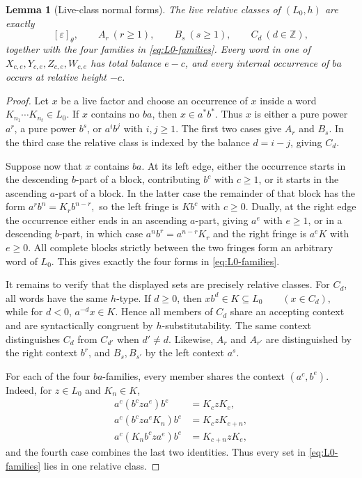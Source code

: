 \documentclass[11pt,a4paper]{article}
\newtheorem{lemma}[theorem]{Lemma}
\newcommand{\eps}{\varepsilon}
\begin{document}
\begin{lemma}[Live-class normal forms]
\label{lem:L0-normal-forms}
The live relative classes of $(L_0,h)$ are exactly
\[
  [\eps]_\theta,\qquad A_r\ (r\ge1),\qquad B_s\ (s\ge1),\qquad C_d\ (d\in\mathbb Z),
\]
together with the four families in \eqref{eq:L0-families}.  Every word in one of
$X_{c,e},Y_{c,e},Z_{c,e},W_{c,e}$ has total balance $e-c$, and every
internal occurrence of $ba$ occurs at relative height $-c$.
\end{lemma}

\begin{proof}
Let $x$ be a live factor and choose an occurrence of $x$ inside a word
\(K_{n_1}\cdots K_{n_t}\in L_0.\)
If $x$ contains no $ba$, then $x\in a^*b^*$.  Thus $x$ is either a
pure power $a^r$, a pure power $b^s$, or $a^i b^j$ with $i,j\ge1$.
The first two cases give $A_r$ and $B_s$.  In the third case the
relative class is indexed by the balance $d=i-j$, giving $C_d$.

Suppose now that $x$ contains $ba$.  At its left edge, either the
occurrence starts in the descending $b$-part of a block, contributing
$b^c$ with $c\ge1$, or it starts in the ascending $a$-part of a block.
In the latter case the remainder of that block has the form
\(a^r b^n=K_r b^{n-r},\)
so the left fringe is $Kb^c$ with $c\ge0$.  Dually, at the right edge
the occurrence either ends in an ascending $a$-part, giving $a^e$
with $e\ge1$, or in a descending $b$-part, in which case
\(a^n b^r=a^{n-r}K_r\)
and the right fringe is $a^eK$ with $e\ge0$.  All complete blocks
strictly between the two fringes form an arbitrary word of $L_0$.
This gives exactly the four forms in \eqref{eq:L0-families}.

It remains to verify that the displayed sets are precisely relative
classes.  For $C_d$, all words have the same $h$-type.  If $d\ge0$,
then
\(x b^d\in K\subseteq L_0 \qquad(x\in C_d),\)
while for $d<0$,
\(a^{-d}x\in K.\)
Hence all members of $C_d$ share an accepting context and are
syntactically congruent by $h$-substitutability.  The same context
distinguishes $C_d$ from $C_{d'}$ when $d'\ne d$.  Likewise, $A_r$
and $A_{r'}$ are distinguished by the right context $b^r$, and
$B_s,B_{s'}$ by the left context $a^s$.

For each of the four $ba$-families, every member shares the context
\((a^c,b^e).\)
Indeed, for $z\in L_0$ and $K_n\in K$,
\[
\begin{aligned}
  a^c(b^cza^e)b^e&=K_c zK_e,\\
  a^c(b^cza^eK_n)b^e&=K_c zK_{e+n},\\
  a^c(K_n b^cza^e)b^e&=K_{c+n}zK_e,
\end{aligned}
\]
and the fourth case combines the last two identities.  Thus every
set in \eqref{eq:L0-families} lies in one relative class.


\end{proof}
\end{document}
